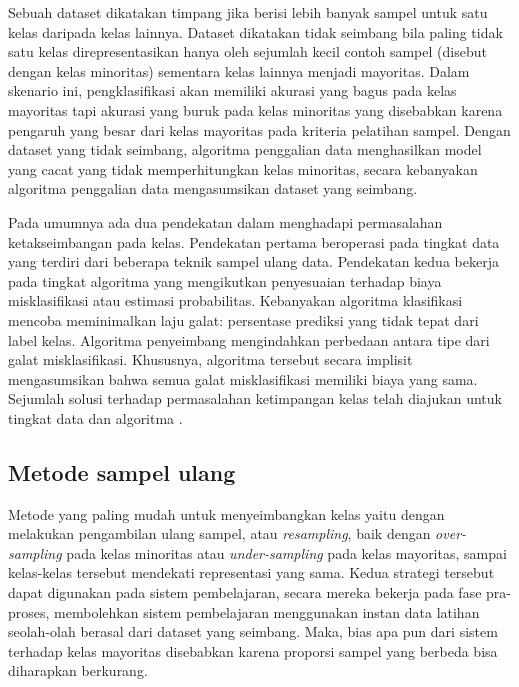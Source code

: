 Sebuah dataset dikatakan timpang jika berisi lebih banyak sampel untuk satu
kelas daripada kelas lainnya.
Dataset dikatakan tidak seimbang bila paling tidak satu kelas direpresentasikan
hanya oleh sejumlah kecil contoh sampel (disebut dengan kelas minoritas)
sementara kelas lainnya menjadi mayoritas.
Dalam skenario ini, pengklasifikasi akan memiliki akurasi yang bagus pada kelas
mayoritas tapi akurasi yang buruk pada kelas minoritas yang disebabkan karena
pengaruh yang besar dari kelas mayoritas pada kriteria pelatihan sampel.
Dengan dataset yang tidak seimbang, algoritma penggalian data menghasilkan
model yang cacat yang tidak memperhitungkan kelas minoritas, secara kebanyakan
algoritma penggalian data mengasumsikan dataset yang seimbang.

Pada umumnya ada dua pendekatan dalam menghadapi permasalahan ketakseimbangan
pada kelas.
Pendekatan pertama beroperasi pada tingkat data yang terdiri dari
beberapa teknik sampel ulang data.
Pendekatan kedua bekerja pada tingkat algoritma yang mengikutkan penyesuaian
terhadap biaya misklasifikasi atau estimasi probabilitas.
Kebanyakan algoritma klasifikasi mencoba meminimalkan laju galat: persentase
prediksi yang tidak tepat dari label kelas.
Algoritma penyeimbang mengindahkan perbedaan antara tipe dari galat
misklasifikasi.
Khususnya, algoritma tersebut secara implisit mengasumsikan bahwa semua galat
misklasifikasi memiliki biaya yang sama.
Sejumlah solusi terhadap permasalahan ketimpangan kelas telah diajukan untuk
tingkat data dan algoritma \cite{chawla2004editorial}.

\label{subsec:metode-resampling}
\subsection{Metode sampel ulang}

Metode yang paling mudah untuk menyeimbangkan kelas yaitu dengan melakukan
pengambilan ulang sampel, atau \textit{resampling}, baik dengan
\textit{over-sampling} pada kelas minoritas atau \textit{under-sampling} pada
kelas mayoritas, sampai kelas-kelas tersebut mendekati representasi yang sama.
Kedua strategi tersebut dapat digunakan pada sistem pembelajaran, secara mereka
bekerja pada fase pra-proses, membolehkan sistem pembelajaran menggunakan
instan data latihan seolah-olah berasal dari dataset yang seimbang.
Maka, bias apa pun dari sistem terhadap kelas mayoritas disebabkan karena
proporsi sampel yang berbeda bisa diharapkan berkurang.

